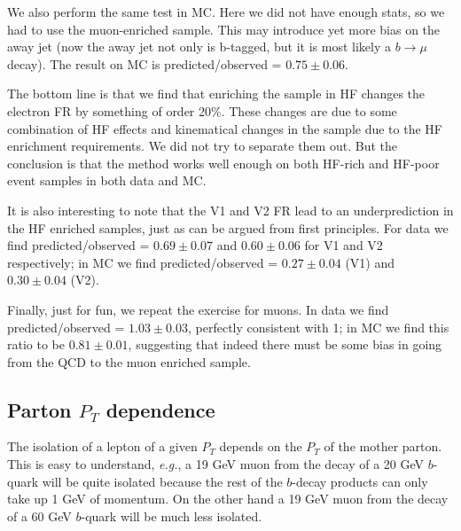 We also perform the same test in MC.  Here we did not have enough stats,
so we had to use the muon-enriched sample. This 
may introduce
yet more bias on the away jet (now the away jet not only
is b-tagged, but it is most likely a $b \to \mu$ decay).
The result on MC is predicted/observed = $0.75 \pm 0.06$.

The bottom line is that we find that enriching the sample in HF changes the 
electron FR by something of order 20\%.  These changes
are due to some combination of HF effects and kinematical
changes in the sample due to the HF enrichment requirements.
We did not try to separate them out.  But the conclusion
is that the method works well enough on both HF-rich and
HF-poor event samples in both data and MC. 

It is also interesting to note that the V1 and V2 FR 
lead to an underprediction in the HF enriched samples,
just as can be argued from first principles.
For data we find  predicted/observed = $0.69 \pm 0.07$
and $0.60 \pm 0.06$ for V1 and V2 respectively; in MC we find 
predicted/observed = $0.27 \pm 0.04$ (V1) and
$0.30 \pm 0.04$ (V2).

Finally, just for fun, we repeat the exercise for muons.
In data we find predicted/observed = $1.03 \pm 0.03$, perfectly
consistent with 1; in MC we find 
this ratio to be $0.81 \pm 0.01$, suggesting that indeed 
there must be some bias in going from the QCD to the muon
enriched sample.

\subsection{Parton $P_T$ dependence}
\label{sec:frpartonpt}

The isolation of a lepton of a given $P_T$ depends 
on the $P_T$ of the mother parton.  This is easy 
to understand, {\em e.g.}, a 19 GeV muon from the
decay of a 20 GeV $b$-quark will be quite isolated
because the rest of the $b$-decay products can only
take up 1 GeV of momentum.  On the other hand a 19 GeV
muon from the decay of a 60 GeV $b$-quark will be much
less isolated.

